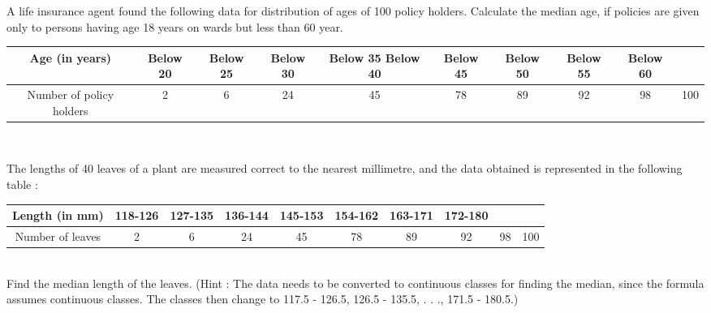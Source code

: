 \item A life insurance agent found the following data for distribution of ages of 100 policy
holders. Calculate the median age, if policies are given only to persons having age 18
years on wards but less than 60 year.
\begin{tabular}{|c|c|c|c|c|c|c|c|c|c|}
\hline
Age (in years)&Below 20&Below 25&Below 30&Below 35 Below 40& Below 45& Below 50& Below 55& Below 60\\
\hline
Number of policy holders&2&6&24&45&78&89&92&98&100\\
\hline
\end{tabular}\\
\item The lengths of 40 leaves of a plant are measured correct to the nearest millimetre, and
the data obtained is represented in the following table :
\begin{tabular}{|c|c|c|c|c|c|c|c|c|c|}
\hline
Length (in mm)&118-126&127-135&136-144&145-153&154-162&163-171&172-180\\
\hline
Number of leaves&2&6&24&45&78&89&92&98&100\\
\hline
\end{tabular}\\
Find the median length of the leaves.
(Hint : The data needs to be converted to continuous classes for finding the median,
since the formula assumes continuous classes. The classes then change to
117.5 - 126.5, 126.5 - 135.5, . . ., 171.5 - 180.5.)
\item 
%
%
%
%

